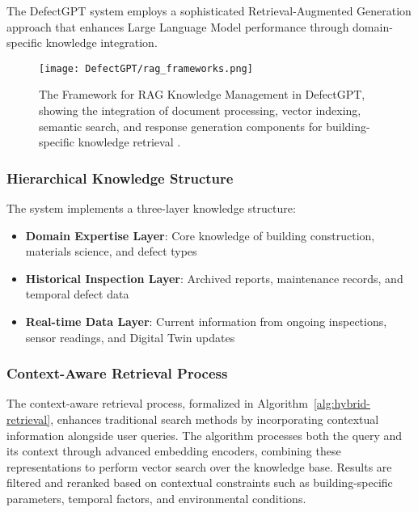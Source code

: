 The DefectGPT system employs a sophisticated Retrieval-Augmented Generation approach that enhances Large Language Model performance through domain-specific knowledge integration.

\begin{figure}[htbp]
    \centering
    \texttt{[image: DefectGPT/rag\_frameworks.png]}
    \caption{The Framework for RAG Knowledge Management in DefectGPT, showing the integration of document processing, vector indexing, semantic search, and response generation components for building-specific knowledge retrieval \cite{zhang2024automated}.}
    \label{fig:rag-framework}
\end{figure}

\subsubsection{Hierarchical Knowledge Structure}

The system implements a three-layer knowledge structure:

\begin{itemize}
    \item \textbf{Domain Expertise Layer}: Core knowledge of building construction, materials science, and defect types
    \item \textbf{Historical Inspection Layer}: Archived reports, maintenance records, and temporal defect data
    \item \textbf{Real-time Data Layer}: Current information from ongoing inspections, sensor readings, and Digital Twin updates
\end{itemize}

\subsubsection{Context-Aware Retrieval Process}

The context-aware retrieval process, formalized in Algorithm~\ref{alg:hybrid-retrieval}, enhances traditional search methods by incorporating contextual information alongside user queries. The algorithm processes both the query and its context through advanced embedding encoders, combining these representations to perform vector search over the knowledge base. Results are filtered and reranked based on contextual constraints such as building-specific parameters, temporal factors, and environmental conditions.

